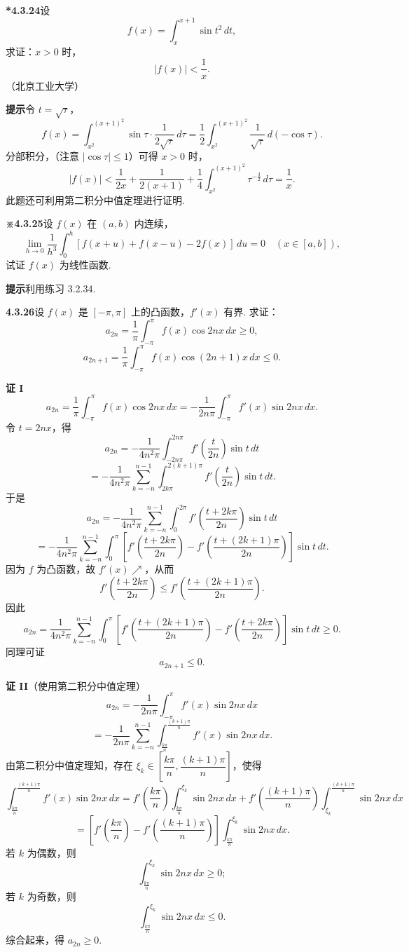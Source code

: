 \documentclass[UTF8,12pt,a4paper,fontset=fandol]{ctexart}
\begin{document}
\noindent\textbf{*4.3.24}\quad 设
\[
f(x)=\int_x^{x+1}\sin t^2\,dt,
\]
求证：$x>0$ 时，
\[
|f(x)|<\frac1x.
\]
（北京工业大学）

\noindent\textbf{提示}\quad 令 $t=\sqrt{\tau}$，
\[
f(x)=\int_{x^2}^{(x+1)^2}\sin\tau\cdot\frac1{2\sqrt\tau}\,d\tau
=\frac12\int_{x^2}^{(x+1)^2}\frac1{\sqrt\tau}\,d(-\cos\tau).
\]
分部积分，（注意 $|\cos\tau|\le1$）可得 $x>0$ 时，
\[
|f(x)|<\frac1{2x}+\frac1{2(x+1)}
+\frac14\int_{x^2}^{(x+1)^2}\tau^{-\frac32}\,d\tau=\frac1x.
\]
此题还可利用第二积分中值定理进行证明.

\noindent\textbf{※4.3.25}\quad 设 $f(x)$ 在 $(a,b)$ 内连续，
\[
\lim_{h\to0}\frac1{h^3}\int_0^h[f(x+u)+f(x-u)-2f(x)]\,du=0
\quad(x\in[a,b]),
\]
试证 $f(x)$ 为线性函数.

\noindent\textbf{提示}\quad 利用练习 3.2.34.

\noindent\textbf{4.3.26}\quad 设 $f(x)$ 是 $[-\pi,\pi]$ 上的凸函数，$f'(x)$ 有界. 求证：
\[
a_{2n}=\frac1\pi\int_{-\pi}^{\pi}f(x)\cos2nx\,dx\ge0,
\]
\[
a_{2n+1}=\frac1\pi\int_{-\pi}^{\pi}f(x)\cos(2n+1)x\,dx\le0.
\]

\noindent\textbf{证 I}\quad
\[
a_{2n}=\frac1\pi\int_{-\pi}^{\pi}f(x)\cos2nx\,dx
=-\frac1{2n\pi}\int_{-\pi}^{\pi}f'(x)\sin2nx\,dx.
\]
令 $t=2nx$，得
\[
a_{2n}=-\frac1{4n^2\pi}\int_{-2n\pi}^{2n\pi}f'\left(\frac t{2n}\right)\sin t\,dt
\]
\[
=-\frac1{4n^2\pi}\sum_{k=-n}^{n-1}
\int_{2k\pi}^{2(k+1)\pi}f'\left(\frac t{2n}\right)\sin t\,dt.
\]
于是
\[
a_{2n}=-\frac1{4n^2\pi}\sum_{k=-n}^{n-1}
\int_0^{2\pi}f'\left(\frac{t+2k\pi}{2n}\right)\sin t\,dt
\]
\[
=-\frac1{4n^2\pi}\sum_{k=-n}^{n-1}
\int_0^\pi\left[
f'\left(\frac{t+2k\pi}{2n}\right)
-f'\left(\frac{t+(2k+1)\pi}{2n}\right)\right]\sin t\,dt.
\]
因为 $f$ 为凸函数，故 $f'(x)\nearrow$，从而
\[
f'\left(\frac{t+2k\pi}{2n}\right)
\le f'\left(\frac{t+(2k+1)\pi}{2n}\right).
\]
因此
\[
a_{2n}=\frac1{4n^2\pi}\sum_{k=-n}^{n-1}
\int_0^\pi\left[
f'\left(\frac{t+(2k+1)\pi}{2n}\right)
-f'\left(\frac{t+2k\pi}{2n}\right)\right]\sin t\,dt\ge0.
\]
同理可证
\[
a_{2n+1}\le0.
\]

\noindent\textbf{证 II}\quad（使用第二积分中值定理）
\[
a_{2n}=-\frac1{2n\pi}\int_{-\pi}^{\pi}f'(x)\sin2nx\,dx
\]
\[
=-\frac1{2n\pi}\sum_{k=-n}^{n-1}
\int_{\frac{k\pi}{n}}^{\frac{(k+1)\pi}{n}}f'(x)\sin2nx\,dx.
\]
由第二积分中值定理知，存在
$\xi_k\in\left[\dfrac{k\pi}{n},\dfrac{(k+1)\pi}{n}\right]$，使得
\[
\int_{\frac{k\pi}{n}}^{\frac{(k+1)\pi}{n}}f'(x)\sin2nx\,dx
=f'\left(\frac{k\pi}{n}\right)
\int_{\frac{k\pi}{n}}^{\xi_k}\sin2nx\,dx
+f'\left(\frac{(k+1)\pi}{n}\right)
\int_{\xi_k}^{\frac{(k+1)\pi}{n}}\sin2nx\,dx
\]
\[
=\left[f'\left(\frac{k\pi}{n}\right)
-f'\left(\frac{(k+1)\pi}{n}\right)\right]
\int_{\frac{k\pi}{n}}^{\xi_k}\sin2nx\,dx.
\]
若 $k$ 为偶数，则
\[
\int_{\frac{k\pi}{n}}^{\xi_k}\sin2nx\,dx\ge0;
\]
若 $k$ 为奇数，则
\[
\int_{\frac{k\pi}{n}}^{\xi_k}\sin2nx\,dx\le0.
\]
综合起来，得 $a_{2n}\ge0$.
\end{document}
